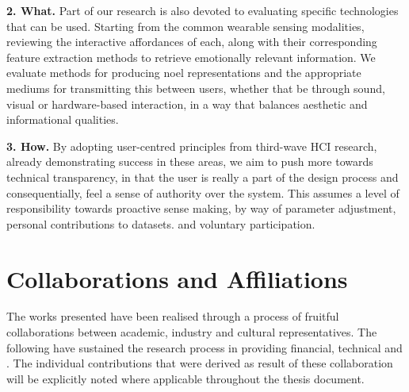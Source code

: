 \textbf{2. What.} Part of our research is also devoted to evaluating specific technologies that can be used. Starting from the common wearable sensing modalities, reviewing the interactive affordances of each, along with their corresponding feature extraction methods to retrieve emotionally relevant information. We evaluate methods for producing noel representations and the appropriate mediums for transmitting this between users, whether that be through sound, visual or hardware-based interaction, in a way that balances aesthetic and informational qualities.

\textbf{3. How.} By adopting user-centred principles from third-wave HCI research, already demonstrating success in these areas, we aim to push more towards technical transparency, in that the user is really a part of the design process and consequentially, feel a sense of authority over the system. This assumes a level of responsibility towards proactive sense making, by way of parameter adjustment, personal contributions to datasets. and voluntary participation.

\section{Collaborations and Affiliations}

The works presented have been realised through a process of fruitful collaborations between academic, industry and cultural representatives. The following have sustained the research process in providing financial, technical and . The individual contributions that were derived as result of these collaboration will be explicitly noted where applicable throughout the thesis document.

